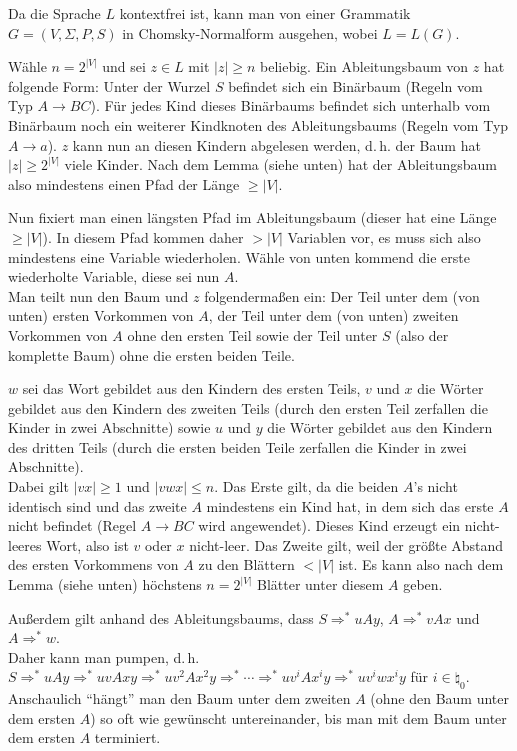 \begin{Beweis}
    Da die Sprache $L$ kontextfrei ist, kann man von einer Grammatik
    $G = (V, \Sigma, P, S)$ in Chomsky-Normalform ausgehen, wobei $L = L(G)$.

    Wähle $n = 2^{|V|}$ und sei $z \in L$ mit $|z| \ge n$ beliebig.
    Ein Ableitungsbaum von $z$ hat folgende Form:
    Unter der Wurzel $S$ befindet sich ein Binärbaum
    (Regeln vom Typ $A \rightarrow BC$).
    Für jedes Kind dieses Binärbaums befindet sich unterhalb vom Binärbaum
    noch ein weiterer Kindknoten des Ableitungsbaums
    (Regeln vom Typ $A \rightarrow a$).
    $z$ kann nun an diesen Kindern abgelesen werden, d.\,h.
    der Baum hat $|z| \ge 2^{|V|}$ viele Kinder.
    Nach dem Lemma (siehe unten) hat der Ableitungsbaum also mindestens einen
    Pfad der Länge $\ge |V|$.

    Nun fixiert man einen längsten Pfad im Ableitungsbaum
    (dieser hat eine Länge $\ge |V|$).
    In diesem Pfad kommen daher $> |V|$ Variablen vor,
    es muss sich also mindestens eine Variable wiederholen.
    Wähle von unten kommend die erste wiederholte Variable,
    diese sei nun $A$.\\
    Man teilt nun den Baum und $z$ folgendermaßen ein:
    Der Teil unter dem (von unten) ersten Vorkommen von $A$,
    der Teil unter dem (von unten) zweiten Vorkommen von $A$
    ohne den ersten Teil
    sowie der Teil unter $S$ (also der komplette Baum) ohne
    die ersten beiden Teile.

    $w$ sei das Wort gebildet aus den Kindern des ersten Teils,
    $v$ und $x$ die Wörter gebildet aus den Kindern des zweiten Teils
    (durch den ersten Teil zerfallen die Kinder in zwei Abschnitte) sowie
    $u$ und $y$ die Wörter gebildet aus den Kindern des dritten Teils
    (durch die ersten beiden Teile zerfallen die Kinder in zwei Abschnitte).\\
    Dabei gilt $|vx| \ge 1$ und $|vwx| \le n$.
    Das Erste gilt, da die beiden $A$'s nicht identisch sind und
    das zweite $A$ mindestens ein Kind hat, in dem sich das erste $A$ nicht
    befindet (Regel $A \rightarrow BC$ wird angewendet).
    Dieses Kind erzeugt ein nicht-leeres Wort, also ist $v$ oder $x$
    nicht-leer.
    Das Zweite gilt, weil der größte Abstand des ersten Vorkommens von $A$ zu
    den Blättern $< |V|$ ist.
    Es kann also nach dem Lemma (siehe unten) höchstens
    $n = 2^{|V|}$ Blätter unter diesem $A$ geben.

    Außerdem gilt anhand des Ableitungsbaums, dass
    $S \Rightarrow^\ast uAy$,
    $A \Rightarrow^\ast vAx$ und
    $A \Rightarrow^\ast w$.\\
    Daher kann man pumpen, d.\,h.
    $S \Rightarrow^\ast uAy \Rightarrow^\ast uvAxy \Rightarrow^\ast uv^2Ax^2y
    \Rightarrow^\ast \dotsb \Rightarrow^\ast uv^iAx^iy \Rightarrow^\ast
    uv^iwx^iy$ für $i \in \natural_0$.
    Anschaulich "`hängt"' man den Baum unter dem zweiten $A$
    (ohne den Baum unter dem ersten $A$) so oft wie gewünscht untereinander,
    bis man mit dem Baum unter dem ersten $A$ terminiert.
\end{Beweis}

